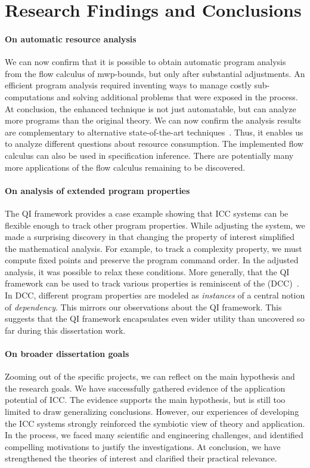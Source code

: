 \section{Research Findings and Conclusions}
\label{sec:aicc-discussion}

\paragraph*{On automatic resource analysis} We can now confirm that it is
possible to obtain automatic program analysis from the flow calculus of
mwp-bounds, but only after substantial adjustments. An efficient program
analysis required inventing ways to manage costly sub-computations and solving
additional problems that were exposed in the process. At conclusion, the
enhanced technique is not just automatable, but can analyze more programs than
the original theory. We can now confirm the analysis results are complementary
to alternative state-of-the-art techniques~\cite[p. 5]{aubert2023b}. Thus, it
enables us to analyze different questions about resource consumption. The
implemented flow calculus can also be used in specification
inference. There are potentially many more applications of
the flow calculus remaining to be discovered.

\paragraph*{On analysis of extended program properties} The QI framework
provides a case example showing that ICC systems can be flexible enough to track
other program properties. While adjusting the system, we made a surprising
discovery in that changing the property of interest simplified the mathematical
analysis. For example, to track a complexity property, we must compute fixed
points and preserve the program command order. In the adjusted analysis, it was
possible to relax these conditions. More generally, that the QI framework can be
used to track various properties is reminiscent of the  (DCC)~\cite{abadi1999b}. In DCC, different program properties are
modeled as \emph{instances} of a central notion of \emph{dependency}. This
mirrors our observations about the QI framework. This suggests that the QI
framework encapsulates even wider utility than uncovered so far during this
dissertation work.

\paragraph*{On broader dissertation goals} Zooming out of the specific
projects, we can reflect on the main hypothesis and the research goals. We have
successfully gathered evidence of the application potential of ICC. The evidence
supports the main hypothesis, but is still too limited to draw generalizing
conclusions. However, our experiences of developing the ICC systems strongly
reinforced the symbiotic view of theory and application. In the process, we
faced many scientific and engineering challenges, and identified compelling
motivations to justify the investigations. At conclusion, we have strengthened
the theories of interest and clarified their practical relevance.


